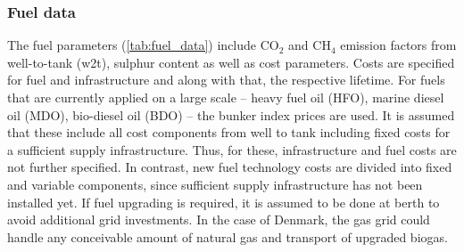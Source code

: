 \documentclass[article]{elsarticle}
\begin{document}
\subsubsection{Fuel data}
The fuel parameters (\autoref{tab:fuel_data}) include CO$_2$ and CH$_4$ emission factors from well-to-tank (w2t), sulphur content as well as cost parameters. Costs are specified for fuel and infrastructure and along with that, the respective lifetime. For fuels that are currently applied on a large scale -- heavy fuel oil (HFO), marine diesel oil (MDO), bio-diesel oil (BDO) -- the bunker index prices are used. It is assumed that these include all cost components from well to tank including fixed costs for a sufficient supply infrastructure. Thus, for these, infrastructure and fuel costs are not further specified. In contrast, new fuel technology costs are divided into fixed and variable components, since sufficient supply infrastructure has not been installed yet. If fuel upgrading is required, it is assumed to be done at berth to avoid additional grid investments. In the case of Denmark, the gas grid could handle any conceivable amount of natural gas and transport of upgraded biogas.
\end{document}
